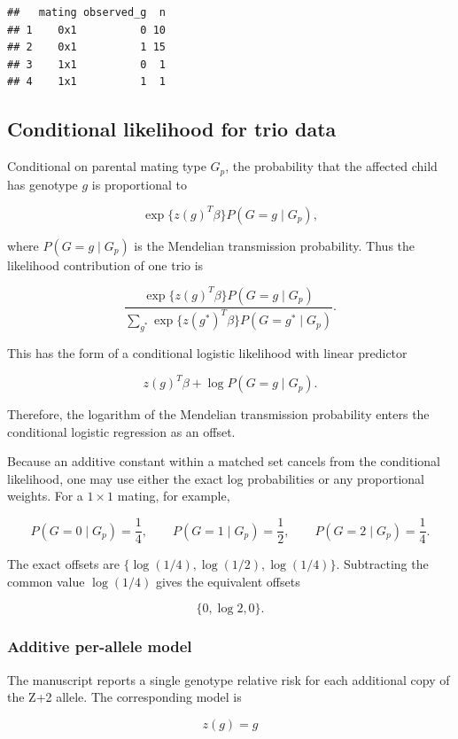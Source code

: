 \documentclass[
]{article}
\begin{document}
\begin{verbatim}
##   mating observed_g  n
## 1    0x1          0 10
## 2    0x1          1 15
## 3    1x1          0  1
## 4    1x1          1  1
\end{verbatim}

\subsection{Conditional likelihood for trio
data}\label{conditional-likelihood-for-trio-data}

Conditional on parental mating type \(G_p\), the probability that the
affected child has genotype \(g\) is proportional to

\[
\exp\{z(g)^T\beta\}P(G=g\mid G_p),
\]

where \(P(G=g\mid G_p)\) is the Mendelian transmission probability. Thus
the likelihood contribution of one trio is

\[
\frac{
  \exp\{z(g)^T\beta\}P(G=g\mid G_p)
}{
  \sum_{g^\ast}
  \exp\{z(g^\ast)^T\beta\}P(G=g^\ast\mid G_p)
}.
\]

This has the form of a conditional logistic likelihood with linear
predictor

\[
z(g)^T\beta+\log P(G=g\mid G_p).
\]

Therefore, the logarithm of the Mendelian transmission probability
enters the conditional logistic regression as an offset.

Because an additive constant within a matched set cancels from the
conditional likelihood, one may use either the exact log probabilities
or any proportional weights. For a \(1\times1\) mating, for example,

\[
P(G=0\mid G_p)=\frac14,\qquad
P(G=1\mid G_p)=\frac12,\qquad
P(G=2\mid G_p)=\frac14.
\]

The exact offsets are \(\{\log(1/4),\log(1/2),\log(1/4)\}\). Subtracting
the common value \(\log(1/4)\) gives the equivalent offsets

\[
\{0,\log 2,0\}.
\]

\subsubsection{Additive per-allele
model}\label{additive-per-allele-model}

The manuscript reports a single genotype relative risk for each
additional copy of the Z+2 allele. The corresponding model is

\[
z(g)=g
\]
\end{document}
